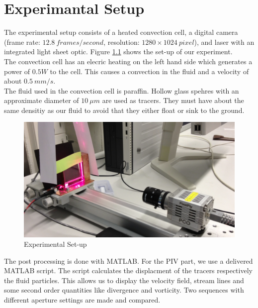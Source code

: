 \chapter{Experimantal Setup}\label{sec:experimentalsetup}

The experimental setup consists of a heated convection cell, a digital camera (frame rate: $12.8\ frames/second$, resolution: $1280 \times 1024\ pixel$), and laser with an integrated light sheet optic. Figure \ref{pic:setup} shows the set-up of our experiment. \\


The convection cell has an elecric heating on the left hand side which generates a power of $0.5 W$ to the cell. This causes a convection in the fluid and a velocity of about $0.5\ mm/s$.\\

The fluid used in the convection cell is paraffin. Hollow glass spehres with an approximate diameter of $10\ \mu m$ are used as tracers. They must have about the same densitiy as our fluid to avoid that they either float or sink to the ground.\\

\begin{figure}[H]
\centering
\includegraphics[width=\textwidth]{pics/setup1.png}
\caption{Experimental Set-up}
\label{pic:setup}
\end{figure}

The post processing is done with MATLAB. For the PIV part, we use a delivered MATLAB script. The script calculates the displacment of the tracers respectively the fluid particles. This allows us to display the velocity field, stream lines and some second order quantities like divergence and vorticity. Two sequences with different aperture settings are made and compared.

